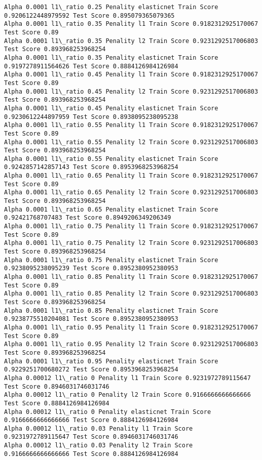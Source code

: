 \documentclass[11pt]{article}
\begin{document}
\begin{Verbatim}[commandchars=\\\{\}]
Alpha 0.0001 l1\_ratio 0.25 Penality elasticnet Train Score 0.9206122448979592 Test Score 0.895079365079365
Alpha 0.0001 l1\_ratio 0.35 Penality l1 Train Score 0.9182312925170067 Test Score 0.89
Alpha 0.0001 l1\_ratio 0.35 Penality l2 Train Score 0.9231292517006803 Test Score 0.893968253968254
Alpha 0.0001 l1\_ratio 0.35 Penality elasticnet Train Score 0.9197278911564626 Test Score 0.8884126984126984
Alpha 0.0001 l1\_ratio 0.45 Penality l1 Train Score 0.9182312925170067 Test Score 0.89
Alpha 0.0001 l1\_ratio 0.45 Penality l2 Train Score 0.9231292517006803 Test Score 0.893968253968254
Alpha 0.0001 l1\_ratio 0.45 Penality elasticnet Train Score 0.9230612244897959 Test Score 0.8938095238095238
Alpha 0.0001 l1\_ratio 0.55 Penality l1 Train Score 0.9182312925170067 Test Score 0.89
Alpha 0.0001 l1\_ratio 0.55 Penality l2 Train Score 0.9231292517006803 Test Score 0.893968253968254
Alpha 0.0001 l1\_ratio 0.55 Penality elasticnet Train Score 0.9242857142857143 Test Score 0.8953968253968254
Alpha 0.0001 l1\_ratio 0.65 Penality l1 Train Score 0.9182312925170067 Test Score 0.89
Alpha 0.0001 l1\_ratio 0.65 Penality l2 Train Score 0.9231292517006803 Test Score 0.893968253968254
Alpha 0.0001 l1\_ratio 0.65 Penality elasticnet Train Score 0.92421768707483 Test Score 0.8949206349206349
Alpha 0.0001 l1\_ratio 0.75 Penality l1 Train Score 0.9182312925170067 Test Score 0.89
Alpha 0.0001 l1\_ratio 0.75 Penality l2 Train Score 0.9231292517006803 Test Score 0.893968253968254
Alpha 0.0001 l1\_ratio 0.75 Penality elasticnet Train Score 0.9238095238095239 Test Score 0.8952380952380953
Alpha 0.0001 l1\_ratio 0.85 Penality l1 Train Score 0.9182312925170067 Test Score 0.89
Alpha 0.0001 l1\_ratio 0.85 Penality l2 Train Score 0.9231292517006803 Test Score 0.893968253968254
Alpha 0.0001 l1\_ratio 0.85 Penality elasticnet Train Score 0.9238775510204081 Test Score 0.8952380952380953
Alpha 0.0001 l1\_ratio 0.95 Penality l1 Train Score 0.9182312925170067 Test Score 0.89
Alpha 0.0001 l1\_ratio 0.95 Penality l2 Train Score 0.9231292517006803 Test Score 0.893968253968254
Alpha 0.0001 l1\_ratio 0.95 Penality elasticnet Train Score 0.9229251700680272 Test Score 0.8953968253968254
Alpha 0.00012 l1\_ratio 0 Penality l1 Train Score 0.9231972789115647 Test Score 0.8946031746031746
Alpha 0.00012 l1\_ratio 0 Penality l2 Train Score 0.9166666666666666 Test Score 0.8884126984126984
Alpha 0.00012 l1\_ratio 0 Penality elasticnet Train Score 0.9166666666666666 Test Score 0.8884126984126984
Alpha 0.00012 l1\_ratio 0.03 Penality l1 Train Score 0.9231972789115647 Test Score 0.8946031746031746
Alpha 0.00012 l1\_ratio 0.03 Penality l2 Train Score 0.9166666666666666 Test Score 0.8884126984126984

\end{Verbatim}
\end{document}
